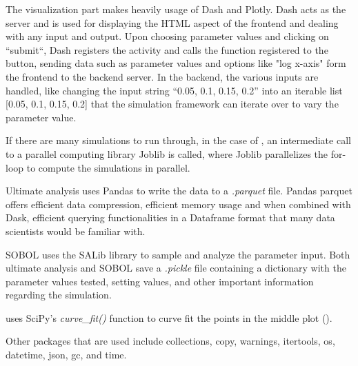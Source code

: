 The visualization part makes heavily usage of Dash and Plotly. 
Dash acts as the server and is used for displaying the HTML aspect of the frontend and dealing with any input and output. 
Upon choosing parameter values and clicking on “submit“, Dash registers the activity and calls the function registered to the button, sending data such as parameter values and options like "log x-axis" form the frontend to the backend server. 
In the backend, the various inputs are handled, like changing the input string “0.05, 0.1, 0.15, 0.2” into an iterable list [0.05, 0.1, 0.15, 0.2] that the simulation framework can iterate over to vary the parameter value. 

If there are many simulations to run through, in the case of , an intermediate call to a parallel computing library Joblib is called, where Joblib parallelizes the for-loop to compute the simulations in parallel. 

Ultimate analysis uses Pandas to write the data to a \textit{.parquet} file. 
Pandas parquet offers efficient data compression, efficient memory usage and when combined with Dask, efficient querying functionalities in a Dataframe format that many data scientists would be familiar with. 

SOBOL uses the SALib library to sample and analyze the parameter input. 
Both ultimate analysis and SOBOL save a \textit{.pickle} file containing a dictionary with the parameter values tested, setting values, and other important information regarding the simulation. 

 uses SciPy's \textit{curve\_fit()} function to curve fit the points in the middle plot (). 

Other packages that are used include collections, copy, warnings, itertools, os, datetime, json, gc, and time. 